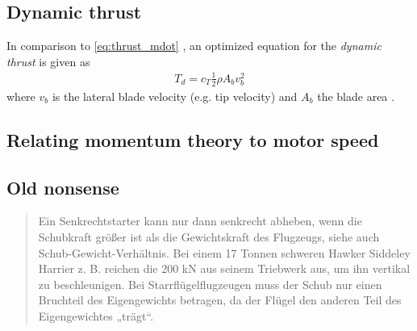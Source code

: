 \subsection{Dynamic thrust}

In comparison to \cref{eq:thrust_mdot} , an optimized equation for the \textit{dynamic thrust} is given as
%
\begin{align}
T_d = c_T \frac{1}{2} \rho A_b v_b^2
\end{align}
%
where $v_b$ is the lateral blade velocity (e.g. tip velocity) and $A_b$ the blade area \cite[chapter~1.6.3]{physing}.



\subsection{Relating momentum theory to motor speed}
\label{subsec:momentum_theory_to_motor}














\subsection{Old nonsense}


\begin{quote}
Ein Senkrechtstarter kann nur dann senkrecht abheben, wenn die Schubkraft größer ist als die Gewichtskraft des Flugzeugs, siehe auch Schub-Gewicht-Verhältnis. Bei einem 17 Tonnen schweren Hawker Siddeley Harrier z. B. reichen die 200 kN aus seinem Triebwerk aus, um ihn vertikal zu beschleunigen. Bei Starrflügelflugzeugen muss der Schub nur einen Bruchteil des Eigengewichts betragen, da der Flügel den anderen Teil des Eigengewichtes „trägt“.
\end{quote}



